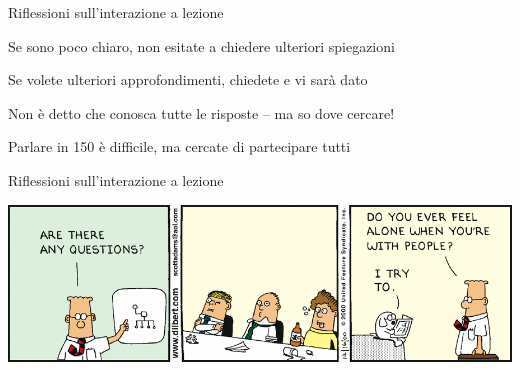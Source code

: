\begin{frame}{Riflessioni sull'interazione a lezione}

\vspace{-12pt}
\begin{myboxtitle}
\BI
\item  Se sono poco chiaro, non esitate a chiedere ulteriori spiegazioni
\item Se volete ulteriori approfondimenti, chiedete e vi sarà dato
\item Non è detto che conosca tutte le risposte -- ma so dove cercare!
\EI
\end{myboxtitle}
\begin{myboxtitle}
\BI
\item Parlare in 150 è difficile, ma cercate di partecipare tutti
\EI
\end{myboxtitle}
\end{frame}


\begin{frame}{Riflessioni sull'interazione a lezione}
	
\begin{center}
\includegraphics[width=\linewidth,height=\textheight,keepaspectratio]{questions.png}
\end{center}
\end{frame}



